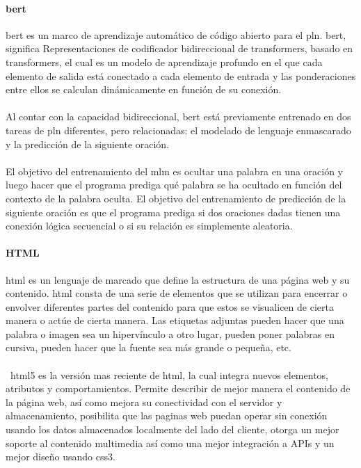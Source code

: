 \documentclass[12pt, a4paper, titlepage]{report}
\begin{document}
	   	\paragraph{\acrshort{bert} \\}
	   	\acrfull{bert} es un marco de aprendizaje automático de código abierto para el \acrfull{pln}. \acrshort{bert}, significa Representaciones de codificador bidireccional de transformers, basado en transformers, el cual es un modelo de aprendizaje profundo en el que cada elemento de salida está conectado a cada elemento de entrada y las ponderaciones entre ellos se calculan dinámicamente en función de su conexión. \cite{refQueesBert} \\\\        
	   	Al contar con  la capacidad bidireccional, \acrshort{bert} está previamente entrenado en dos tareas de \acrshort{pln} diferentes, pero relacionadas: el modelado de lenguaje enmascarado y la predicción de la siguiente oración.\\\\        
	   	El objetivo del entrenamiento del \acrfull{mlm} es ocultar una palabra en una oración y luego hacer que el programa prediga qué palabra se ha ocultado en función del contexto de la palabra oculta. El objetivo del entrenamiento de predicción de la siguiente oración es que el programa prediga si dos oraciones dadas tienen una conexión lógica secuencial o si su relación es simplemente aleatoria.\par
	   	
	   	\paragraph{HTML\\}
	   	
	   	\acrfull{html} es un lenguaje de marcado que define la estructura de una página web y su contenido. \acrshort{html} consta de una serie de elementos que se utilizan para encerrar o envolver diferentes partes del contenido para que estos se visualicen de cierta manera o actúe de cierta manera. Las etiquetas adjuntas pueden hacer que una palabra o imagen sea un hipervínculo a otro lugar, pueden poner palabras en cursiva, pueden hacer que la fuente sea más grande o pequeña, etc. \cite{refHtml} \\\\\
	   	\acrshort{html}5 es la versión mas reciente de html, la cual integra nuevos elementos, atributos y comportamientos. Permite describir de mejor manera el contenido de la página web, así como mejora su conectividad con el servidor y almacenamiento, posibilita que las paginas web puedan operar sin conexión usando los datos almacenados localmente del lado del cliente, otorga un mejor soporte al contenido multimedia así como una mejor integración a APIs y un mejor diseño usando \acrshort{css}3.	\cite{refHtml2}		
	   	
\end{document}

